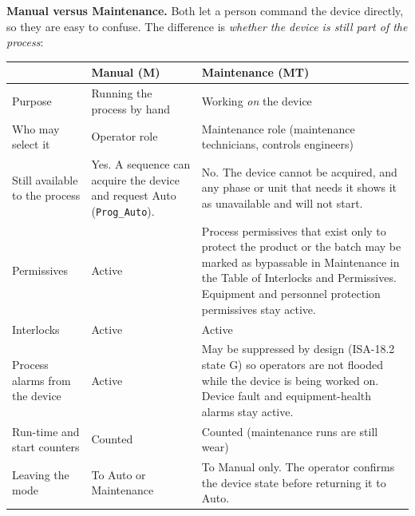 \textbf{Manual versus Maintenance.} Both let a person command the device directly, so they are easy to confuse. The difference is \emph{whether the device is still part of the process}:
\begin{longtable}{@{}P{4.20cm}P{6.15cm}P{6.16cm}@{}}
\toprule
{} & \textbf{Manual (M)} & \textbf{Maintenance (MT)} \\
\midrule
\endhead
Purpose & Running the process by hand & Working \emph{on} the device \\
Who may select it & Operator role & Maintenance role (maintenance technicians, controls engineers) \\
Still available to the process & Yes. A sequence can acquire the device and request Auto (\texttt{Prog\_Auto}). & No. The device cannot be acquired, and any phase or unit that needs it shows it as unavailable and will not start. \\
Permissives & Active & Process permissives that exist only to protect the product or the batch may be marked as bypassable in Maintenance in the Table of Interlocks and Permissives. Equipment and personnel protection permissives stay active. \\
Interlocks & Active & Active \\
Process alarms from the device & Active & May be suppressed by design (ISA-18.2 state G) so operators are not flooded while the device is being worked on. Device fault and equipment-health alarms stay active. \\
Run-time and start counters & Counted & Counted (maintenance runs are still wear) \\
Leaving the mode & To Auto or Maintenance & To Manual only. The operator confirms the device state before returning it to Auto. \\
\bottomrule
\end{longtable}

